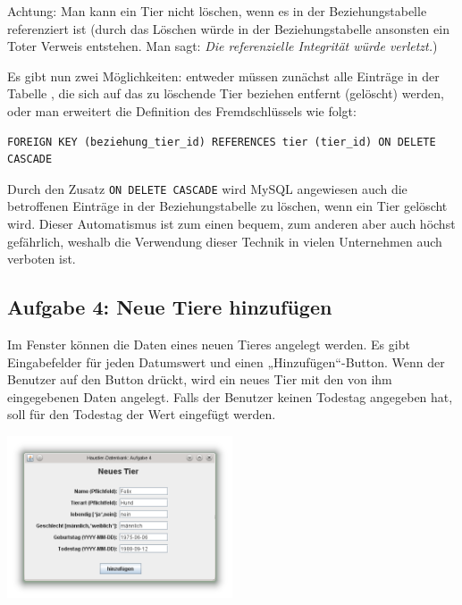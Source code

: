Achtung: Man kann ein Tier nicht löschen, wenn es in der Beziehungstabelle
referenziert ist (durch das Löschen würde in der Beziehungstabelle ansonsten
ein Toter Verweis entstehen. Man sagt: \emph{Die referenzielle Integrität würde
verletzt.})

Es gibt nun zwei Möglichkeiten: entweder müssen zunächst alle Einträge in der
Tabelle , die sich auf das zu löschende Tier beziehen
entfernt (gelöscht) werden, oder man erweitert die Definition des
Fremdschlüssels wie folgt:

\begin{lstlisting}
FOREIGN KEY (beziehung_tier_id) REFERENCES tier (tier_id) ON DELETE CASCADE
\end{lstlisting}

Durch den Zusatz \lstinline|ON DELETE CASCADE| wird MySQL angewiesen auch die
betroffenen Einträge in der Beziehungstabelle zu löschen, wenn ein Tier
gelöscht wird. Dieser Automatismus ist zum einen bequem, zum anderen aber auch
höchst gefährlich, weshalb die Verwendung dieser Technik in vielen Unternehmen
auch verboten ist.
\subsection{Aufgabe 4: Neue Tiere hinzufügen}

Im Fenster können die Daten eines neuen Tieres angelegt werden. Es gibt
Eingabefelder für jeden Datumswert und einen „Hinzufügen“-Button. Wenn der
Benutzer auf den Button drückt, wird ein neues Tier mit den von ihm eingegebenen
Daten angelegt. Falls der Benutzer keinen Todestag angegeben hat, soll für den
Todestag der Wert  eingefügt werden.

\includegraphics[width=0.5\textwidth]{./inf/SEKII/37_JavaSQL_Datenbankzugriffe/HaustierAufgabe4.png}


